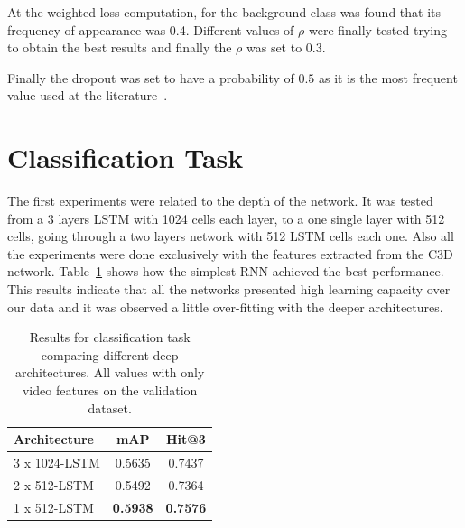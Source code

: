 At the weighted loss computation, for the background class was found that its frequency of appearance was 0.4. Different values of $\rho$ were finally tested trying to obtain the best results and finally the $\rho$ was set to $0.3$.

Finally the dropout was set to have a probability of $0.5$ as it is the most frequent value used at the literature~\cite{srivastava2014dropout}.


\section{Classification Task}

The first experiments were related to the depth of the network.
It was tested from a 3 layers LSTM with 1024 cells each layer, to a one single layer with 512 cells, going through a two layers network with 512 LSTM cells each one.
Also all the experiments were done exclusively with the features extracted from the C3D network.
Table~\ref{table:classification_by_architecture} shows how the simplest RNN achieved the best performance. This results indicate that all the networks presented high learning capacity over our data and it was observed a little over-fitting with the deeper architectures.

\begin{table}[H]
\begin{center}
\begin{tabular}{|l|c|c|}
\hline
Architecture & mAP & Hit@3 \\
\hline\hline
3 x 1024-LSTM & 0.5635 & 0.7437 \\
2 x 512-LSTM & 0.5492 & 0.7364 \\
1 x 512-LSTM & \bf0.5938 & \bf0.7576 \\
\hline
\end{tabular}
\end{center}
\caption{Results for classification task comparing different deep architectures. All values with
         only video features on the validation dataset.}
\label{table:classification_by_architecture}
\end{table}

